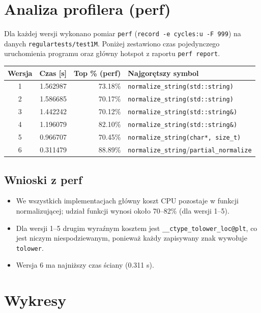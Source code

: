 \documentclass{article}
\begin{document}
\section{Analiza profilera (perf)}

Dla każdej wersji wykonano pomiar \texttt{perf} (\texttt{record -e cycles:u -F 999}) na danych \texttt{regulartests/test1M}. Poniżej zestawiono czas pojedynczego uruchomienia programu oraz główny hotspot z raportu \texttt{perf report}.

\begin{center}
\begin{tabular}{|c|r|r|l|}
\hline
\textbf{Wersja} & \textbf{Czas [s]} & \textbf{Top \% (perf)} & \textbf{Najgorętszy symbol} \\
\hline
1 & 1.562987 & 73.18\% & \texttt{normalize\_string(std::string)} \\
2 & 1.586685 & 70.17\% & \texttt{normalize\_string(std::string)} \\
3 & 1.442242 & 70.12\% & \texttt{normalize\_string(std::string\&)} \\
4 & 1.196079 & 82.10\% & \texttt{normalize\_string(std::string\&)} \\
5 & 0.966707 & 70.45\% & \texttt{normalize\_string(char*, size\_t)} \\
6 & 0.311479 & 88.89\% & \texttt{normalize\_string}/\texttt{partial\_normalize} \\
\hline
\end{tabular}
\end{center}

\subsection*{Wnioski z perf}
\begin{itemize}
    \item We wszystkich implementacjach główny koszt CPU pozostaje w funkcji normalizującej; udział funkcji wynosi około 70--82\% (dla wersji 1--5).
    \item Dla wersji 1--5 drugim wyraźnym kosztem jest \texttt{\_\_ctype\_tolower\_loc@plt}, co jest niczym niespodziewanym, ponieważ każdy zapisywany znak wywołuje \texttt{tolower}.
    \item Wersja 6 ma najniższy czas ściany (0.311 s).
\end{itemize}

\section{Wykresy}
\end{document}
